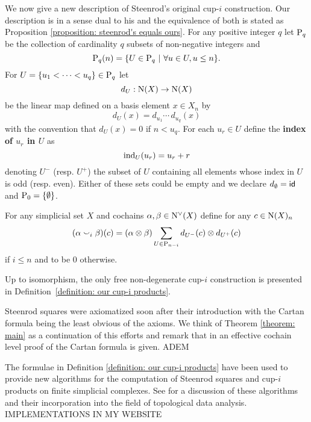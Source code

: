 We now give a new description of Steenrod's original cup-$i$ construction. Our description is in a sense dual to his and the equivalence of both is stated as Proposition \ref{proposition: steenrod's equals ours}. For any positive integer $q$ let $\P_q$ be the collection of cardinality $q$ subsets of non-negative integers and
\[
\P_q(n) = \{ U \in \P_q\ |\ \forall u \in U, u \leq n\}.
\]
 For $U = \{u_1 < \cdots < u_q\} \in \P_q$ let
\[
d_U : \chains(X) \to \chains(X)
\]
be the linear map defined on a basis element $x \in X_n$ by
\[
d_U (x) = d_{u_1} \cdots \, d_{u_q} (x)
\]
with the convention that $d_U(x) = 0$ if $n < u_q$. For each $u_r \in U$ define the \textbf{index of $u_r$ in $U$} as
\[
\ind_U(u_r) = u_r + r
\]
denoting $U^-$ (resp. $U^+$) the subset of $U$ containing all elements whose index in $U$ is odd (resp. even). Either of these sets could be empty and we declare $d_\emptyset = \id$ and $\P_0 = \{\emptyset\}$.

\begin{definition} \label{definition: our cup-i products}
	For any simplicial set $X$ and cochains $\alpha, \beta \in \cochains(X)$ define for any $c \in \chains(X)_n$
	\[
	(\alpha \cup_i \beta)(c) =
	(\alpha \tensor \beta) \sum_{U\in\P_{n-i}} d_{U^-}(c) \tensor d_{U^+}(c)
	\]
	if  $i \leq n$ and to be $0$ otherwise.
\end{definition}

\begin{theorem} \label{theorem: main}
	Up to isomorphism, the only free non-degenerate cup-$i$ construction is presented in \mbox{Definition \ref{definition: our cup-i products}}.
\end{theorem}

\begin{remark}
	Steenrod squares were axiomatized soon after their introduction with the Cartan formula being the least obvious of the axioms. We think of Theorem \ref{theorem: main} as a continuation of this efforts and remark that in \cite{medina2020cartan} an effective cochain level proof of the Cartan formula is given.
	ADEM
\end{remark}

\begin{remark}
	The formulae in Definition \ref{definition: our cup-i products} have been used to provide new algorithms for the computation of Steenrod squares and cup-$i$ products on finite simplicial complexes. See \cite{medina2018persistence} for a discussion of these algorithms and their incorporation into the field of topological data analysis. IMPLEMENTATIONS IN MY WEBSITE
\end{remark}

